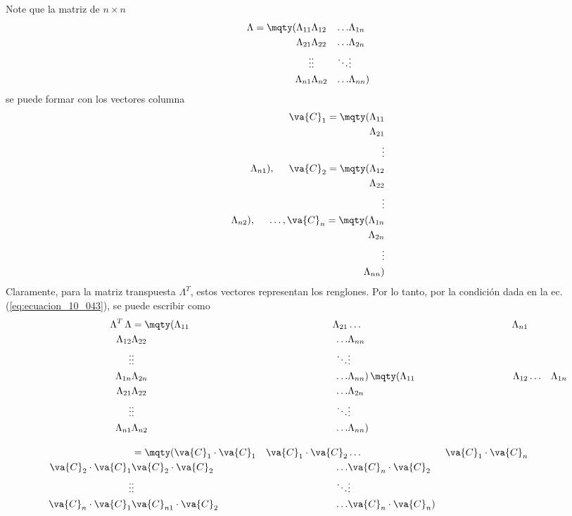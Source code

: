 \par
Note que la matriz de $n \times n$
\begin{align}
\Lambda = \mqty(\Lambda_{11} & \Lambda_{12} & \ldots & \Lambda_{1n} \\ \Lambda_{21} & \Lambda_{22} & \ldots & \Lambda_{2n} \\ \vdots & \vdots & \ddots & \vdots \\ \Lambda_{n1} & \Lambda_{n2} & \ldots & \Lambda_{nn})
\label{eq:ecuacion_10_44}
\end{align}
se puede formar con los vectores columna
\begin{align}
\va{C}_{1} = \mqty(\Lambda_{11} \\ \Lambda_{21} \\ \vdots \\ \Lambda_{n1}), \hspace{0.5cm} \va{C}_{2} = \mqty(\Lambda_{12} \\ \Lambda_{22} \\ \vdots \\ \Lambda_{n2}), \hspace{0.5cm} \ldots, \va{C}_{n} = \mqty(\Lambda_{1n} \\ \Lambda_{2n} \\ \vdots \\ \Lambda_{nn})
\label{eq:ecuacion_10_045}
\end{align}
Claramente, para la matriz transpuesta $\Lambda^{T}$, estos vectores representan los renglones. Por lo tanto, por la condición dada en la ec. (\ref{eq:ecuacion_10_043}), se puede escribir como
\begin{align}
\Lambda^{T} \, \Lambda &= \mqty(\Lambda_{11} & \Lambda_{21} & \ldots & \Lambda_{n1} \\ \Lambda_{12} & \Lambda_{22} & \ldots & \Lambda_{nn} \\ \vdots & \vdots & \ddots & \vdots \\ \Lambda_{1n} & \Lambda_{2n} & \ldots & \Lambda_{nn}) \, \mqty(\Lambda_{11} & \Lambda_{12} & \ldots & \Lambda_{1n} \\ \Lambda_{21} & \Lambda_{22} & \ldots & \Lambda_{2n} \\ \vdots & \vdots & \ddots & \vdots \\ \Lambda_{n1} & \Lambda_{n2} & \ldots & \Lambda_{nn}) \nonumber \\[1em]
&= \mqty(\va{C}_{1} \cdot \va{C}_{1} & \va{C}_{1} \cdot \va{C}_{2} & \ldots & \va{C}_{1} \cdot \va{C}_{n} \\ \va{C}_{2} \cdot \va{C}_{1} & \va{C}_{2} \cdot \va{C}_{2} & \ldots & \va{C}_{n} \cdot \va{C}_{2} \\ \vdots & \vdots & \ddots & \vdots \\ \va{C}_{n} \cdot \va{C}_{1} & \va{C}_{n1} \cdot \va{C}_{2} & \ldots & \va{C}_{n} \cdot \va{C}_{n})
\label{eq:ecuacion_10_046}
\end{align}
